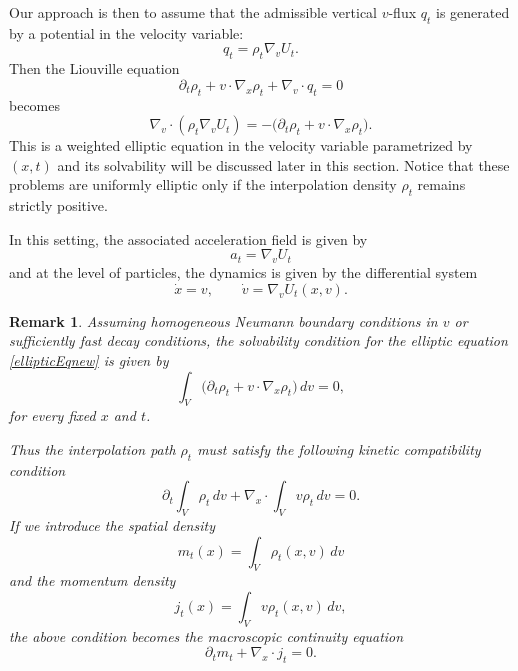 \documentclass[11pt]{article}
\newtheorem{remark}{Remark}[section]
\begin{document}
\medskip



Our approach is then to assume that the admissible vertical
$v$-flux \(q_t\) is generated by a potential in the velocity variable:
\[
        q_t=\rho_t\nabla_v U_t .
\]
Then the Liouville equation
\[
        \partial_t\rho_t
        +
        v\cdot\nabla_x\rho_t
        +
        \nabla_v\cdot q_t
        =
        0
\]
becomes
\begin{equation}
        \nabla_v\cdot(\rho_t\nabla_v U_t)
        = - \big( \partial_t\rho_t + v\cdot\nabla_x\rho_t  \big).
        \label{ellipticEqnew}
\end{equation}
This is a weighted elliptic equation in the velocity variable parametrized by
\((x,t)\) and its solvability will be discussed later in this section. Notice that these problems are uniformly
elliptic only if the interpolation density $\rho_t$ remains strictly positive. 



\medskip


In this setting, the associated acceleration field is given by
\[
        a_t=\nabla_v U_t 
\]
and at the level of particles, the dynamics is given by the differential system
\[
        \dot x=v,
        \qquad
        \dot v=\nabla_v U_t(x,v).
\]
\begin{remark}
Assuming homogeneous Neumann boundary
conditions in \(v\) or sufficiently fast decay conditions, the solvability condition for the elliptic equation \eqref{ellipticEqnew} is given by 
\begin{equation}\label{solvcond}
        \int_V  \big(
        \partial_t\rho_t
        +
        v\cdot\nabla_x\rho_t
        \big)\,dv
        = 0 ,
\end{equation}
for every fixed \(x\) and \(t\).


Thus the interpolation path \(\rho_t\) must satisfy the
following kinetic compatibility condition
\begin{equation*}
        \partial_t\int_V\rho_t\,dv +  \nabla_x\cdot\int_V v\rho_t\,dv  = 0 .
\end{equation*}
If we introduce the spatial density
\[
        m_t(x)=\int_V\rho_t(x,v)\,dv
\]
and the momentum density
\[
        j_t(x)=\int_V v\rho_t(x,v)\,dv ,
\]
the above condition becomes the macroscopic continuity equation
\[
        \partial_t m_t+\nabla_x\cdot j_t=0 .
\]
\end{remark}
\end{document}
